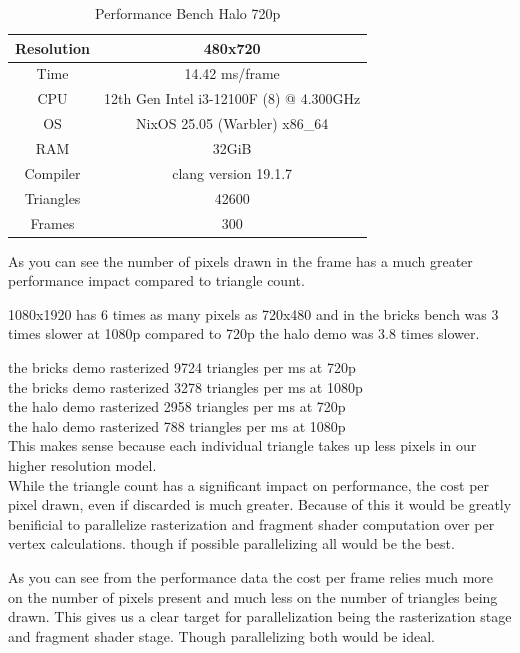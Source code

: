 \documentclass[12pt]{article}
\begin{document}
\begin{table}[H]
	\caption{Performance Bench Halo 720p}
	\centering
	\begin{tabular}{|c|c|}
		\hline
		Resolution& 480x720\\\hline
		Time& 14.42 ms/frame\\\hline
		CPU&12th Gen Intel i3-12100F (8) @ 4.300GHz\\\hline
		OS&NixOS 25.05 (Warbler) x86\_64\\\hline
		RAM&32GiB\\\hline
		Compiler&clang version 19.1.7\\\hline
		Triangles&42600\\\hline
		Frames&300\\\hline
	\end{tabular}
	\label{table:performance-720-halo}
\end{table}

As you can see the number of pixels drawn in the frame has a much greater performance impact compared to triangle count. 

1080x1920 has 6 times as many pixels as 720x480 and in the bricks bench was 3 times slower at 1080p compared to 720p
the halo demo was 3.8 times slower. 

the bricks demo rasterized 9724 triangles per ms at 720p\\
the bricks demo rasterized 3278 triangles per ms at 1080p\\
the halo demo rasterized 2958 triangles per ms at 720p\\
the halo demo rasterized 788 triangles per ms at 1080p\\

This makes sense because each individual triangle takes up less pixels in our higher resolution model. \\

While the triangle count has a significant impact on performance, the cost per pixel drawn, even if discarded is much greater. Because of this it would be greatly benificial to parallelize rasterization and fragment shader computation over per vertex calculations. though if possible parallelizing all would be the best.


As you can see from the performance data the cost per frame relies much more on the number of pixels present and much less on the number of triangles being drawn. This gives us a clear target for parallelization being the rasterization stage and fragment shader stage. Though parallelizing both would be ideal.
\end{document}
